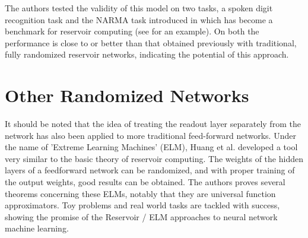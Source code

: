 \documentclass[12pt,oneside]{CUNY_CS_PhD}
\begin{document}
The authors tested the validity of this model on two tasks, a spoken digit recognition task and the NARMA task introduced in \cite{atiya2000new} which has become a benchmark for reservoir computing (see \cite{lukosevicius_survey:_2009} for an example). On both the performance is close to or better than that obtained previously with traditional, fully randomized reservoir networks, indicating the potential of this approach.


\section{Other Randomized Networks}
It should be noted that the idea of treating the readout layer separately from the network has also been applied to more traditional feed-forward networks. Under the name of 'Extreme Learning Machines' (ELM), Huang et al. \cite{huang_extreme_200,huang_extreme_2011} developed a tool very similar to the basic theory of reservoir computing. The weights of the hidden layers of a feedforward network can be randomized, and with proper training of the output weights, good results can be obtained. The authors proves several theorems concerning these ELMs, notably that they are universal function approximators. Toy problems and real world tasks are tackled with success, showing the promise of the Reservoir / ELM approaches to neural network machine learning.
\end{document}
